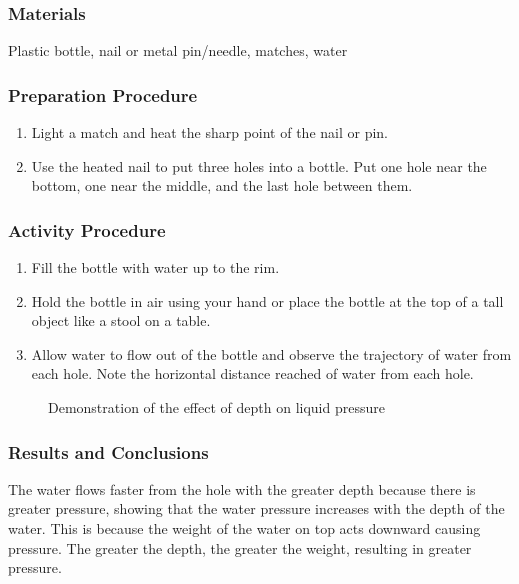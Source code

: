 \subsubsection*{Materials}
Plastic bottle, nail or metal pin/needle, matches, water


\subsubsection*{Preparation Procedure}
\begin{enumerate}
\item{Light a match and heat the sharp point of the nail or pin.} 
\item{Use the heated nail to put three holes into a bottle. Put one hole near the bottom, one near the middle, and the last hole between them.} 
\end{enumerate}

\subsubsection*{Activity Procedure}
\begin{enumerate}
\item{Fill the bottle with water up to the rim.} 
\item{Hold the bottle in air using your hand or place the bottle at the top of a tall object like a stool on a table.} 
\item{Allow water to flow out of the bottle and observe the trajectory of water from each hole. Note the horizontal distance reached of water from each hole.} 
\end{enumerate}

\begin{figure}
\begin{center}
\def\svgwidth{250pt}

\caption{Demonstration of the effect of depth on liquid pressure}
\label{fig:pressure-liquid}
\end{center}
\end{figure}

\subsubsection*{Results and Conclusions}
The water flows faster from the hole with the greater depth because there is greater pressure, showing that the water pressure increases with the depth of the water. This is because the weight of the water on top acts downward causing pressure. The greater the depth, the greater the weight, resulting in greater pressure. 

